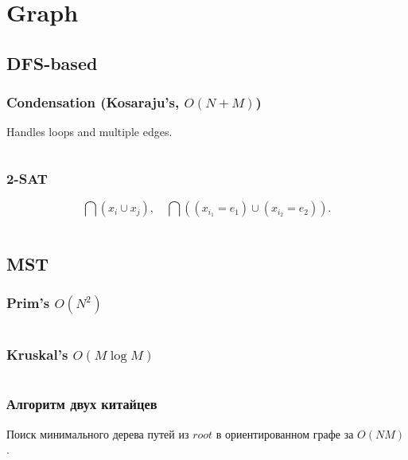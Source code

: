 \section{Graph}

\subsection{DFS-based}
\subsubsection{Condensation (Kosaraju's, $O(N+M)$)}
Handles loops and multiple edges.
\inputminted{cpp}{../code/graph/dfs/kosaraju.cpp}
\subsubsection{2-SAT}
$$\bigcap(x_i\cup x_j),\quad\bigcap((x_{i_1}=e_1)\cup(x_{i_2}=e_2)).$$
\inputminted{cpp}{../code/graph/dfs/tsat.cpp}

\subsection{MST}
\subsubsection{Prim's $O(N^2)$}
\inputminted{cpp}{../code/graph/mst/prim.cpp}
\subsubsection{Kruskal's $O(M\log M)$}
\inputminted{cpp}{../code/graph/mst/kruskal.cpp}
\subsubsection{Алгоритм двух китайцев}
Поиск минимального дерева путей из $root$ в ориентированном графе за $O(NM)$.
\inputminted{cpp}{../code/graph/mst/directed.cpp}